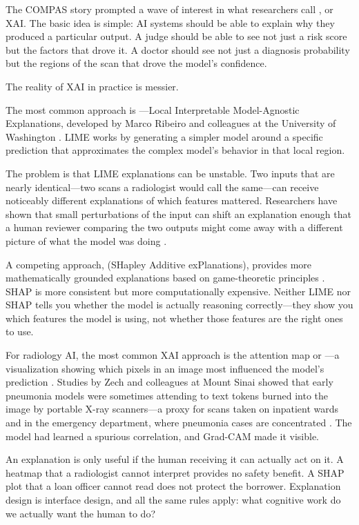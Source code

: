 The COMPAS story prompted a wave of interest in what researchers call , or XAI. The basic idea is simple: AI systems should be able to explain why they produced a particular output. A judge should be able to see not just a risk score but the factors that drove it. A doctor should see not just a diagnosis probability but the regions of the scan that drove the model's confidence.

The reality of XAI in practice is messier.

The most common approach is ---Local Interpretable Model-Agnostic Explanations, developed by Marco Ribeiro and colleagues at the University of Washington \autocite{ribeiro2016lime}. LIME works by generating a simpler model around a specific prediction that approximates the complex model's behavior in that local region.

The problem is that LIME explanations can be unstable. Two inputs that are nearly identical---two scans a radiologist would call the same---can receive noticeably different explanations of which features mattered. Researchers have shown that small perturbations of the input can shift an explanation enough that a human reviewer comparing the two outputs might come away with a different picture of what the model was doing \autocite{alvarezmelis2018robustness}.

A competing approach,  (SHapley Additive exPlanations), provides more mathematically grounded explanations based on game-theoretic principles \autocite{lundberg2017shap}. SHAP is more consistent but more computationally expensive. Neither LIME nor SHAP tells you whether the model is actually reasoning correctly---they show you which features the model is using, not whether those features are the right ones to use.

For radiology AI, the most common XAI approach is the attention map or ---a visualization showing which pixels in an image most influenced the model's prediction \autocite{selvaraju2017gradcam}. Studies by Zech and colleagues at Mount Sinai showed that early pneumonia models were sometimes attending to text tokens burned into the image by portable X-ray scanners---a proxy for scans taken on inpatient wards and in the emergency department, where pneumonia cases are concentrated \autocite{zech2018variable}. The model had learned a spurious correlation, and Grad-CAM made it visible.

\begin{technote}
An explanation is only useful if the human receiving it can actually act on it. A heatmap that a radiologist cannot interpret provides no safety benefit. A SHAP plot that a loan officer cannot read does not protect the borrower. Explanation design is interface design, and all the same rules apply: what cognitive work do we actually want the human to do?
\end{technote}

